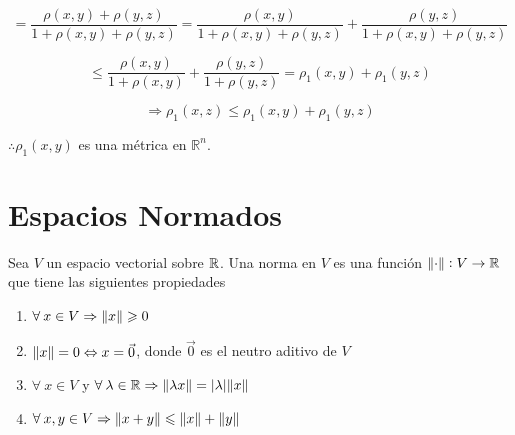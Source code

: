\begin{proofexplanation}
\begin{enumerate}[label=(\subscript{D}{{\arabic*}})]
\begin{equation*}
    =\frac{{\rho}(x,y)+{\rho}(y,z)}{1+{\rho}(x,y)+{\rho}(y,z)}=\frac{{\rho}(x,y)}{1+{\rho}(x,y)+{\rho}(y,z)}+\frac{{\rho}(y,z)}{1+{\rho}(x,y)+{\rho}(y,z)}
\end{equation*}

\begin{equation*}
    \leqslant \frac{{\rho}(x,y)}{1+{\rho}(x,y)}+\frac{{\rho}(y,z)}{1+{\rho}(y,z)}={\rho}_{1}(x,y)+{\rho}_{1}(y,z) 
\end{equation*}

\begin{equation*}
    \Rightarrow {\rho}_{1}(x,z) \leqslant {\rho}_{1}(x,y)+{\rho}_{1}(y,z)
\end{equation*}
\end{enumerate}

$\therefore {\rho}_{1}(x,y)$ es una métrica en $\mathbb{R}^{n}$.
\end{proofexplanation}



\section{Espacios Normados}


\begin{definition}[Norma]
    Sea $V$ un espacio vectorial sobre $\mathbb{R}$. Una norma en $V$ es una función $\norm{\cdot} : V \to \mathbb{R}$ que tiene las siguientes propiedades
    \begin{enumerate}[label=(\subscript{N}{{\arabic*}})]
    \item $\forall \: x \in V \Rightarrow \norm{x} \geqslant 0$
    \item $\norm{x} = 0 \Leftrightarrow x = \vec{0}$, donde $\vec{0}$ es el neutro aditivo de $V$
    \item $\forall \: x \in V$ y $\forall \: \lambda \in \mathbb{R} \Rightarrow \norm{\lambda x} = \abs{\lambda} \norm{x}$
    \item $\forall \: x,y \in V \Rightarrow \norm{x+y} \leqslant \norm{x} + \norm{y}$
    \end{enumerate}
\end{definition}

